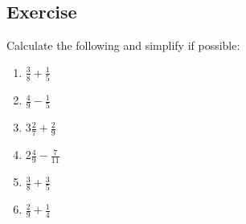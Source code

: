 \subsection{Exercise}
Calculate the following and simplify if possible:
\begin{multicols}{2}
\begin{enumerate}
	\item $\displaystyle \frac{3}{8} + \frac{1}{5}$
	\item $\displaystyle \frac{4}{9} - \frac{1}{5}$
	\item $\displaystyle 3 \frac{2}{7} + \frac{2}{9}$
	\item $\displaystyle 2 \frac{4}{9} - \frac{7}{11}$
	\item $\displaystyle \frac{3}{8} + \frac{3}{5}$
	\item $\displaystyle \frac{2}{9} + \frac{1}{4}$
\end{enumerate}
\end{multicols}
